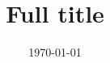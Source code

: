 \documentclass{amsart}
\title[Short title]{Full title}
\date{\today}
\begin{document}
	
	\maketitle
	
	
	\nocite{*}
	\sloppy
	\printbibliography
\end{document}
